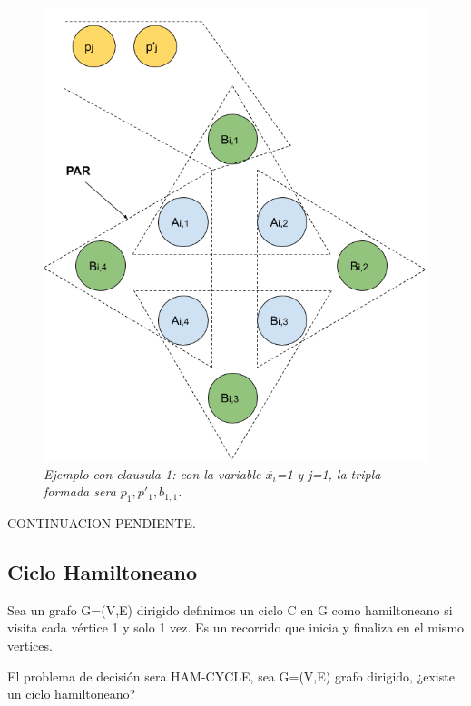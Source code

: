 \documentclass{article}
\begin{document}
\begin{figure}[h!]
    \begin{center} 
    \includegraphics[scale=0.3]{imagenes/ejemplo-3dm-gadget-ci.png}
    \caption{\small \sl Ejemplo con clausula 1: con la variable  \(\overline{x_i}\)=1 y j=1, la tripla formada sera \(p_1, p'_1, b_{1,1}\).}
\end{center}
\end{figure}

CONTINUACION PENDIENTE.


\newpage
\subsection{Ciclo Hamiltoneano}
Sea un grafo G=(V,E) dirigido definimos un ciclo C en G como hamiltoneano si visita cada vértice
1 y solo 1 vez. Es un recorrido que inicia y finaliza en el mismo vertices.

El problema de decisión sera HAM-CYCLE, sea G=(V,E) grafo dirigido, ¿existe un ciclo hamiltoneano?
\end{document}
